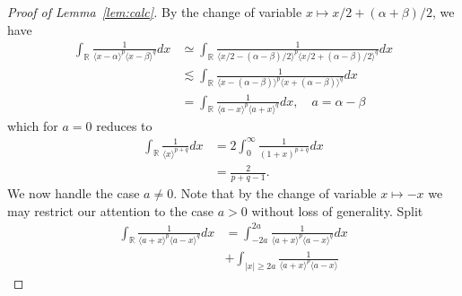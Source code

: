 \documentclass[12pt,reqno]{amsart}
\numberwithin{equation}{section}  %
\numberwithin{figure}{section}
\newcommand{\rr}{\mathbb{R}}
\newcommand{\wh}{\widehat}
\newcommand{\p}{\partial}
\begin{document}
%
%
\begin{proof}[Proof of Lemma~\ref{lem:calc}]
%
By the change of variable $x \mapsto x/2 + (\alpha + \beta)/2$, we have
%
%
\begin{equation}
\label{rry}
\begin{split}
\int_{\rr} \frac{1}{\langle x - \alpha \rangle^{p} \langle  x -
\beta
\rangle^{q}}d x
& \simeq \int_{\rr} \frac{1}{\langle x/2 - (\alpha - \beta)/2  \rangle^{p}
\langle  x/2 + (\alpha - \beta)/2 \rangle^{q}} d x
\\
& \lesssim \int_{\rr} \frac{1}{\langle x - (\alpha - \beta)  \rangle^{p}
\langle  x + (\alpha - \beta) \rangle^{q}} d x
\\
& = \int_{\rr} \frac{1}{\langle a - x \rangle ^{p} \langle a + x \rangle
^{q}} d x, \quad a = \alpha - \beta
\end{split}
\end{equation}
%
which for $a =0$ reduces to 
%
%
\begin{equation*}
\begin{split}
\int_{\rr} \frac{1}{\langle x \rangle ^{p+q}} d x 
& = 2 \int_{0}^{\infty} \frac{1}{(1 + x)^{p+q}} d x
\\
& = \frac{2}{p+q -1}.
\end{split}
\end{equation*}
%
%
We now handle the case $a \neq 0$. Note that by the change of variable $x \mapsto
-x$ we may restrict our attention to the case  $a > 0$ without loss of
generality. Split
%
%
\begin{equation*}
\begin{split}
\int_{\rr} \frac{1}{\langle a + x \rangle ^{p} \langle a - x \rangle
^{q}} d x
& = \int_{-2a}^{2a}
\frac{1}{\langle a + x \rangle ^{p} \langle a - x \rangle
^{q}} d x
\\
& + \int_{| x | \ge 2a} 
\frac{1}{\langle a + x \rangle ^{p} \langle a - x \rangle
}
\end{split}
\end{equation*}
\end{proof}
\end{document}
